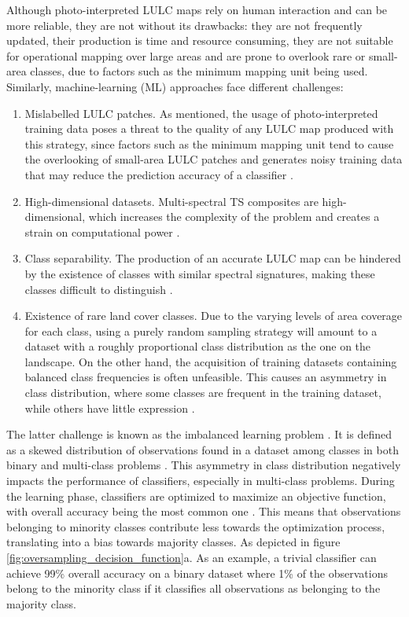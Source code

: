 \documentclass[parskip=full]{scrartcl}
\begin{document}
Although photo-interpreted LULC maps rely on human interaction and can be more
reliable, they are not without its drawbacks: they are not frequently updated,
their production is time and resource consuming, they are not suitable for
operational mapping over large areas and are prone to overlook rare or
small-area classes, due to factors such as the minimum mapping unit being used.
Similarly, machine-learning (ML) approaches face different challenges:
\begin{enumerate}
	\item Mislabelled LULC patches. As mentioned, the usage of photo-interpreted
	      training data poses a threat to the quality of any LULC map produced
	      with this strategy, since factors such as the minimum mapping unit
	      tend to cause the overlooking of small-area LULC patches and generates
	      noisy training data that may reduce the prediction accuracy of a
	      classifier \cite{Pelletier2017}.
	\item High-dimensional datasets. Multi-spectral TS composites are
	      high-dimensional, which increases the complexity of the problem and
	      creates a strain on computational power \cite{Stromann2020}.
	\item Class separability. The production of an accurate LULC map can be
	      hindered by the existence of classes with similar spectral signatures,
	      making these classes difficult to distinguish
	      \cite{Alonso-Sarria2019}.
	\item Existence of rare land cover classes. Due to the varying levels of
	      area coverage for each class, using a purely random sampling strategy
	      will amount to a dataset with a roughly proportional class
	      distribution as the one on the landscape. On the other hand, the
	      acquisition of training datasets containing balanced class frequencies
	      is often unfeasible. This causes an asymmetry in class distribution,
	      where some classes are frequent in the training dataset, while others
	      have little expression \cite{Wang2019, Feng2019}.
\end{enumerate}


The latter challenge is known as the imbalanced learning problem
\cite{Chawla2004}. It is defined as a skewed distribution of observations found
in a dataset among classes in both binary and multi-class problems
\cite{Abdi2016}. This asymmetry in class distribution negatively impacts the
performance of classifiers, especially in multi-class problems. During the
learning phase, classifiers are optimized to maximize an objective function,
with overall accuracy being the most common one \cite{Maxwell2018}. This means
that observations belonging to minority classes contribute less towards the
optimization process, translating into a bias towards majority classes. As
depicted in figure \ref{fig:oversampling_decision_function}a. As an example, a
trivial classifier can achieve 99\% overall accuracy on a binary dataset where
1\% of the observations belong to the minority class if it classifies all
observations as belonging to the majority class.
\end{document}

